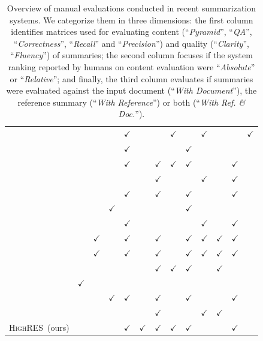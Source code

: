 \documentclass[11pt,a4paper]{article}
\newcommand\highres{\textsc{HighRES}}
\begin{document}
\begin{table}[th!]
\begin{tabular}{r | c c c c c c c | c c | c c r}
\citet{Guo2018a}        &   &  &   &  $\checkmark$  & &  &  $\checkmark$    &    &  $\checkmark$     &     &    &  $\checkmark$  \\
\citet{Hardy2018}      &   &  &   & $\checkmark$  & &   &     & $\checkmark$  &      &     &    &   \\
\citet{Hsu2018}         &  &  &    &  $\checkmark$  & &  $\checkmark$ &  $\checkmark$    &  $\checkmark$   &      &     &  $\checkmark$   &  \\
\citet{Krishna2018a}       &   &  &   &  &  &  $\checkmark$ &     &    &  $\checkmark$     &     &  $\checkmark$   &    \\
\citet{Kryscinski2018}     &   &  &   &  $\checkmark$ & &  $\checkmark$ & &  $\checkmark$   &      &  & $\checkmark$ &   \\
\citet{Li2018a}         &   &   & $\checkmark$ &  &  &   &     &  $\checkmark$   &      &     &     &    \\
\citet{narayan-sidenet18}      & &   &    &  $\checkmark$ & &  &     &    & $\checkmark$ &  &  $\checkmark$   &    \\
\citet{narayan18xsum}          &   &  $\checkmark$ &    &  $\checkmark$ &  &  $\checkmark$ &     &  $\checkmark$  &  $\checkmark$     &   $\checkmark$  &  $\checkmark$   &   \\
\citet{Narayan2018}       &   & $\checkmark$ &   &  $\checkmark$  & &  $\checkmark$ &     &  $\checkmark$  &  $\checkmark$   &  $\checkmark$   &  $\checkmark$  &   \\
\citet{Peyrard2018a}     &   &  &   &  &  &  $\checkmark$ &  $\checkmark$    &  $\checkmark$   &      &  $\checkmark$    &    &   \\
\citet{ShafieiBavani2018}      &  $\checkmark$ &  &    &  &  &  &     &    &      &     &    &  \\
\citet{Song2018}       &   &  & $\checkmark$   &  $\checkmark$ &  &  $\checkmark$ &     &  $\checkmark$   &      &     &  $\checkmark$   & \\
\citet{Yang2017b}       &  &  &    &  &  &  $\checkmark$ &     &    &  $\checkmark$     &  $\checkmark$    &    & \\
\highres\ (ours)    &   &  &   & $\checkmark$ & $\checkmark$ & $\checkmark$  &  $\checkmark$   & $\checkmark$  &      &     &  $\checkmark$  &   \\
\hline
\end{tabular}
\caption{Overview of manual evaluations conducted in recent summarization systems. We categorize them in three dimensions: the first column identifies matrices used for evaluating content (``\textit{Pyramid}'', ``\textit{QA}'', ``\textit{Correctness}'', ``\textit{Recall}'' and ``\textit{Precision}'') and quality (``\textit{Clarity}'', ``\textit{Fluency}'') of summaries; the second column focuses if the system ranking reported by humans on content evaluation were ``\textit{Absolute}'' or ``\textit{Relative}''; and finally, the third column evaluates if summaries were evaluated against the input document (``\textit{With Document}''), the reference summary (``\textit{With Reference}'') or both (``\textit{With Ref. \& Doc.}'').}
\label{tab:litreview}
\end{table}
\end{document}
